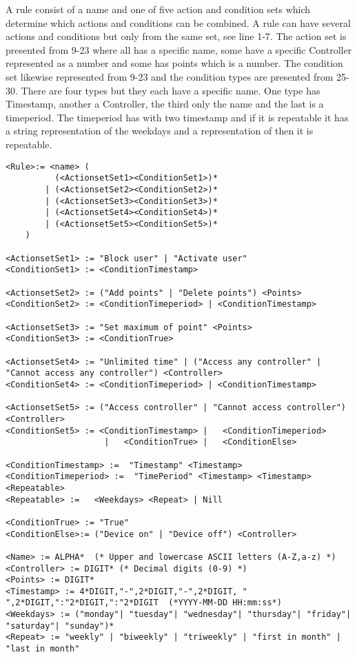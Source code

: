 A rule consist of a name and one of five action and condition sets which determine which actions and conditions can be combined. A rule can have several actions and conditions but only from the same set, see line 1-7. The action set is presented from 9-23 where all has a specific name, some have a specific Controller represented as a number and some has points which is a number. The condition set likewise represented from 9-23 and the condition types are presented from 25-30. There are four types but they each have a specific name. One type has Timestamp, another a Controller, the third only the name and the last is a timeperiod. The timeperiod has with two timestamp and if it is repeatable it has a string representation of the weekdays and a representation of then it is repeatable. 
\begin{lstlisting}[frame=single, label=grammar, caption=Grammar of a rule in EBNF]
<Rule>:= <name> (
	 	  (<ActionsetSet1><ConditionSet1>)*
		| (<ActionsetSet2><ConditionSet2>)*
		| (<ActionsetSet3><ConditionSet3>)*
		| (<ActionsetSet4><ConditionSet4>)*
		| (<ActionsetSet5><ConditionSet5>)*
	)

<ActionsetSet1> := "Block user" | "Activate user" 
<ConditionSet1> := <ConditionTimestamp>

<ActionsetSet2> := ("Add points" | "Delete points") <Points>
<ConditionSet2> := <ConditionTimeperiod> | <ConditionTimestamp>

<ActionsetSet3> := "Set maximum of point" <Points>
<ConditionSet3> := <ConditionTrue>

<ActionsetSet4> := "Unlimited time" | ("Access any controller" | "Cannot access any controller") <Controller>
<ConditionSet4> := <ConditionTimeperiod> | <ConditionTimestamp> 

<ActionsetSet5> := ("Access controller" | "Cannot access controller")<Controller>
<ConditionSet5> := <ConditionTimestamp> |	<ConditionTimeperiod> 
					| 	<ConditionTrue>	|	<ConditionElse>	
				
<ConditionTimestamp> :=  "Timestamp" <Timestamp>
<ConditionTimeperiod> :=  "TimePeriod" <Timestamp> <Timestamp> <Repeatable>					
<Repeatable> :=   <Weekdays> <Repeat> | Nill

<ConditionTrue> := "True" 
<ConditionElse>:= ("Device on" | "Device off") <Controller>
				
<Name> := ALPHA*  (* Upper and lowercase ASCII letters (A-Z,a-z) *)
<Controller> := DIGIT* (* Decimal digits (0-9) *)
<Points> := DIGIT*
<Timestamp> := 4*DIGIT,"-",2*DIGIT,"-",2*DIGIT, " ",2*DIGIT,":"2*DIGIT,":"2*DIGIT  (*YYYY-MM-DD HH:mm:ss*)
<Weekdays> := ("monday"| "tuesday"| "wednesday"| "thursday"| "friday"| "saturday"| "sunday")*
<Repeat> := "weekly" | "biweekly" | "triweekly" | "first in month" | "last in month"
\end{lstlisting}
